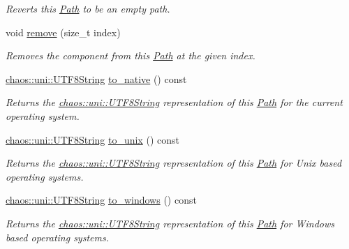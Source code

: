 \begin{DoxyCompactItemize}
\begin{DoxyCompactList}\small\item\em Reverts this \hyperlink{classchaos_1_1io_1_1sys_1_1_path}{Path} to be an empty path. \end{DoxyCompactList}\item 
void \hyperlink{classchaos_1_1io_1_1sys_1_1_path_aefc69b11820209acca278104fb230832}{remove} (size\-\_\-t index)
\begin{DoxyCompactList}\small\item\em Removes the component from this \hyperlink{classchaos_1_1io_1_1sys_1_1_path}{Path} at the given index. \end{DoxyCompactList}\item 
\hyperlink{classchaos_1_1uni_1_1_u_t_f8_string}{chaos\-::uni\-::\-U\-T\-F8\-String} \hyperlink{classchaos_1_1io_1_1sys_1_1_path_adb68b7589d18dc78f19d9dd6936d9833}{to\-\_\-native} () const 
\begin{DoxyCompactList}\small\item\em Returns the \hyperlink{classchaos_1_1uni_1_1_u_t_f8_string}{chaos\-::uni\-::\-U\-T\-F8\-String} representation of this \hyperlink{classchaos_1_1io_1_1sys_1_1_path}{Path} for the current operating system. \end{DoxyCompactList}\item 
\hyperlink{classchaos_1_1uni_1_1_u_t_f8_string}{chaos\-::uni\-::\-U\-T\-F8\-String} \hyperlink{classchaos_1_1io_1_1sys_1_1_path_a1cfe95a7a81ba7da856ae79917e6b1bf}{to\-\_\-unix} () const 
\begin{DoxyCompactList}\small\item\em Returns the \hyperlink{classchaos_1_1uni_1_1_u_t_f8_string}{chaos\-::uni\-::\-U\-T\-F8\-String} representation of this \hyperlink{classchaos_1_1io_1_1sys_1_1_path}{Path} for Unix based operating systems. \end{DoxyCompactList}\item 
\hyperlink{classchaos_1_1uni_1_1_u_t_f8_string}{chaos\-::uni\-::\-U\-T\-F8\-String} \hyperlink{classchaos_1_1io_1_1sys_1_1_path_ad7b185968a88741d52526a32738d0ab4}{to\-\_\-windows} () const 
\begin{DoxyCompactList}\small\item\em Returns the \hyperlink{classchaos_1_1uni_1_1_u_t_f8_string}{chaos\-::uni\-::\-U\-T\-F8\-String} representation of this \hyperlink{classchaos_1_1io_1_1sys_1_1_path}{Path} for Windows based operating systems. \end{DoxyCompactList}\item 

\end{DoxyCompactItemize}
